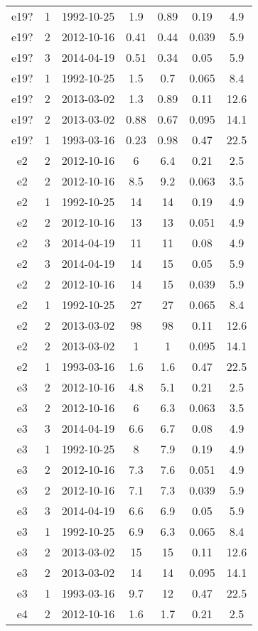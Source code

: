 \begin{longtable}[htp]
\begin{longtable}{ccccccc}
e19? & 1 & 1992-10-25 & 1.9 & 0.89 & 0.19 & 4.9 \\
e19? & 2 & 2012-10-16 & 0.41 & 0.44 & 0.039 & 5.9 \\
e19? & 3 & 2014-04-19 & 0.51 & 0.34 & 0.05 & 5.9 \\
e19? & 1 & 1992-10-25 & 1.5 & 0.7 & 0.065 & 8.4 \\
e19? & 2 & 2013-03-02 & 1.3 & 0.89 & 0.11 & 12.6 \\
e19? & 2 & 2013-03-02 & 0.88 & 0.67 & 0.095 & 14.1 \\
e19? & 1 & 1993-03-16 & 0.23 & 0.98 & 0.47 & 22.5 \\
e2 & 2 & 2012-10-16 & 6 & 6.4 & 0.21 & 2.5 \\
e2 & 2 & 2012-10-16 & 8.5 & 9.2 & 0.063 & 3.5 \\
e2 & 1 & 1992-10-25 & 14 & 14 & 0.19 & 4.9 \\
e2 & 2 & 2012-10-16 & 13 & 13 & 0.051 & 4.9 \\
e2 & 3 & 2014-04-19 & 11 & 11 & 0.08 & 4.9 \\
e2 & 3 & 2014-04-19 & 14 & 15 & 0.05 & 5.9 \\
e2 & 2 & 2012-10-16 & 14 & 15 & 0.039 & 5.9 \\
e2 & 1 & 1992-10-25 & 27 & 27 & 0.065 & 8.4 \\
e2 & 2 & 2013-03-02 & 98 & 98 & 0.11 & 12.6 \\
e2 & 2 & 2013-03-02 & 1\ee{2} & 1\ee{2} & 0.095 & 14.1 \\
e2 & 1 & 1993-03-16 & 1.6\ee{2} & 1.6\ee{2} & 0.47 & 22.5 \\
e3 & 2 & 2012-10-16 & 4.8 & 5.1 & 0.21 & 2.5 \\
e3 & 2 & 2012-10-16 & 6 & 6.3 & 0.063 & 3.5 \\
e3 & 3 & 2014-04-19 & 6.6 & 6.7 & 0.08 & 4.9 \\
e3 & 1 & 1992-10-25 & 8 & 7.9 & 0.19 & 4.9 \\
e3 & 2 & 2012-10-16 & 7.3 & 7.6 & 0.051 & 4.9 \\
e3 & 2 & 2012-10-16 & 7.1 & 7.3 & 0.039 & 5.9 \\
e3 & 3 & 2014-04-19 & 6.6 & 6.9 & 0.05 & 5.9 \\
e3 & 1 & 1992-10-25 & 6.9 & 6.3 & 0.065 & 8.4 \\
e3 & 2 & 2013-03-02 & 15 & 15 & 0.11 & 12.6 \\
e3 & 2 & 2013-03-02 & 14 & 14 & 0.095 & 14.1 \\
e3 & 1 & 1993-03-16 & 9.7 & 12 & 0.47 & 22.5 \\
e4 & 2 & 2012-10-16 & 1.6 & 1.7 & 0.21 & 2.5 \\

\end{longtable}
\end{longtable}
